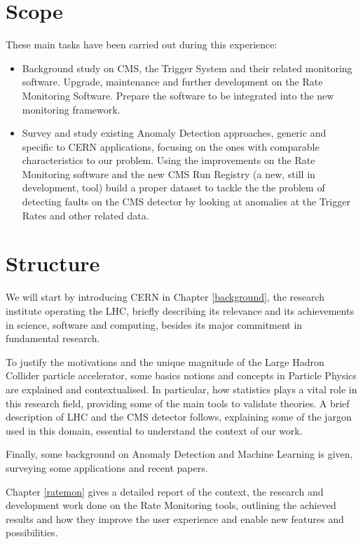 \section{Scope}

These main tasks have been carried out during this experience:

\begin{itemize}

	\item Background study on CMS, the Trigger System and their related monitoring software. Upgrade, maintenance and further development on the Rate Monitoring Software. Prepare the software to be integrated into the new monitoring framework.
	\item Survey and study existing Anomaly Detection approaches, generic and specific to CERN applications, focusing on the ones with comparable characteristics to our problem. Using the improvements on the Rate Monitoring software and the new CMS Run Registry (a new, still in development, tool) build a proper dataset to tackle the the problem of detecting faults on the CMS detector by looking at anomalies at the Trigger Rates and other related data. 

\end{itemize}

\section{Structure}

We will start by introducing CERN in Chapter \ref{background}, the research institute operating the LHC, briefly describing its relevance and its achievements in science, software and computing, besides its major commitment in fundamental research.

To justify the motivations and the unique magnitude of the Large Hadron Collider particle accelerator, some basics notions and concepts in Particle Physics are explained and contextualised. In particular, how statistics plays a vital role in this research field, providing some of the main tools to validate theories. A brief description of LHC and the CMS detector follows, explaining some of the jargon used in this domain, essential to understand the context of our work.

Finally, some background on Anomaly Detection and Machine Learning is given, surveying some applications and recent papers.

Chapter \ref{ratemon} gives a detailed report of the context, the research and development work done on the Rate Monitoring tools, outlining the achieved results and how they improve the user experience and enable new features and possibilities.

